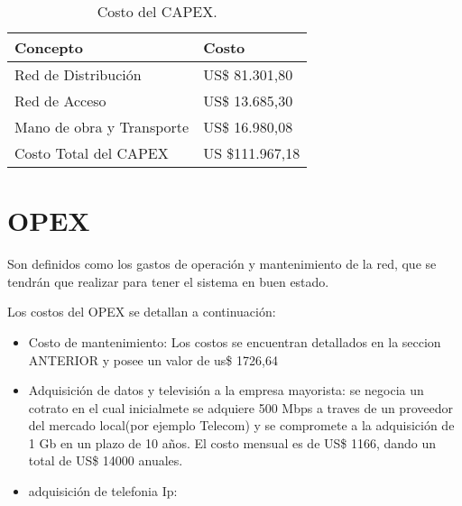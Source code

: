 \begin{table}[H]
\centering
\begin{tabular}{|l|l|}
\hline
\rowcolor[HTML]{C5D9F1}
Concepto                  & Costo          \\ \hline
Red de Distribución       & US\$ 81.301,80   \\ \hline
Red de Acceso             & US\$ 13.685,30 \\ \hline
Mano de obra y Transporte & US\$ 16.980,08     \\ \hline
Costo Total del CAPEX     & US \$111.967,18 \\ \hline
\end{tabular}
  \caption{Costo del CAPEX.}
  \label{tab:capex}
\end{table}






\section{OPEX}

Son definidos como los gastos de operación y mantenimiento de la red, que se tendrán que realizar para tener el sistema en buen estado.

Los costos del OPEX se detallan a continuación:

\begin{itemize}
\item Costo de mantenimiento: Los costos se encuentran detallados en la seccion ANTERIOR y posee un valor de us\$ 1726,64

\item Adquisición de datos y televisión a la empresa mayorista: se negocia un cotrato en el cual inicialmete se adquiere 500 Mbps a traves de un proveedor del mercado local(por ejemplo Telecom) y se compromete a la adquisición de  1 Gb en un plazo de 10 años. El costo mensual es de US\$ 1166, dando un total de US\$ 14000 anuales.

\item adquisición de telefonia Ip:



\end{itemize}



